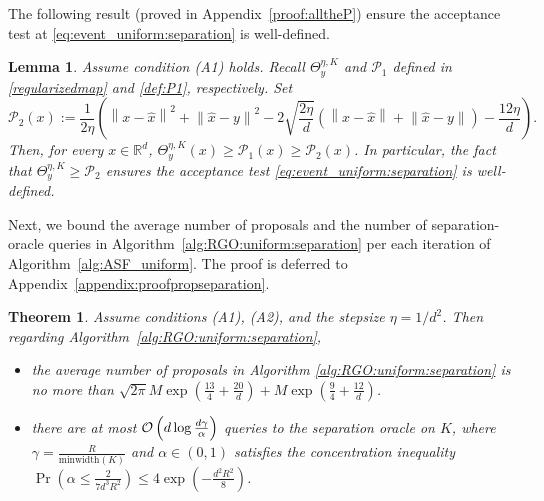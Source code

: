 \documentclass[11pt,letterpaper]{article}
\newcommand{\R}{\mathbb{R}}
\newcommand{\norm}[1]{\left\lVert #1 \right\rVert}
\newcommand{\proj}{\operatorname{proj}}
\newcommand{\brac}[1]{\left( #1\right)}
\newtheorem{theorem}[thm]{Theorem}
\newtheorem{lemma}[thm]{Lemma}
\begin{document}
The following result (proved in Appendix~\ref{proof:alltheP}) ensure the acceptance test at \eqref{eq:event_uniform:separation} is well-defined. 

\begin{lemma} \label{lem:comparealltheP}
Assume condition (A1) holds. Recall $\Theta^{\eta,K}_y$ and $\mathcal{P}_1$ defined in \eqref{regularizedmap} and \eqref{def:P1}, respectively. Set
\begin{equation}\label{def:P2}
    \mathcal{P}_2(x):=\frac{1}{2\eta}\brac{\norm{x-\hat{x}}^2+\norm{\hat{x}-y}^2-2\sqrt{\frac{2\eta}{d}}\brac{\norm{x-\hat{x}}+\norm{\hat{x}-y}}-\frac{12\eta}{d}}. 
\end{equation}
Then, for every $x\in \R^d$, $   \Theta^{\eta,K}_y(x)\ge \mathcal{P}_1(x)\ge \mathcal{P}_2(x)$. In particular, the fact that $\Theta^{\eta,K}_y\geq \mathcal{P}_2$ ensures the acceptance test \eqref{eq:event_uniform:separation} is well-defined. 
\end{lemma}



Next, we bound the average number of proposals and the number of separation-oracle queries in Algorithm~\ref{alg:RGO:uniform:separation} per each iteration of Algorithm~\ref{alg:ASF_uniform}. The proof is deferred to Appendix~\ref{appendix:proofpropseparation}.

\begin{theorem}
    \label{theo:averagerejection_separation}
    Assume conditions (A1), (A2), and the stepsize $\eta =1/d^2$. Then regarding Algorithm~\ref{alg:RGO:uniform:separation}, 

    \begin{itemize}
        \item[a)] the average number of proposals in Algorithm \ref{alg:RGO:uniform:separation} is no more than $\sqrt{2\pi} M\exp\brac{\frac{13}{4}+\frac{20}{d}} + M \exp\brac{\frac{9}{4}+\frac{12}{d}}$. 
        \item[b)] there are at most ${\cal O}\left(d \log \frac{d \gamma}{\alpha}\right)$ queries to the separation oracle on $K$, where $\gamma=\frac{R}{\mbox{minwidth}(K)}$ and $\alpha\in (0,1)$ satisfies the concentration inequality $    \Pr\brac{\alpha\leq \frac{2}{7 d^3 R^2} }\leq 4 \exp\brac{-\frac{d^2R^2}{8}}$. 
    \end{itemize}
\end{theorem}
\end{document}
